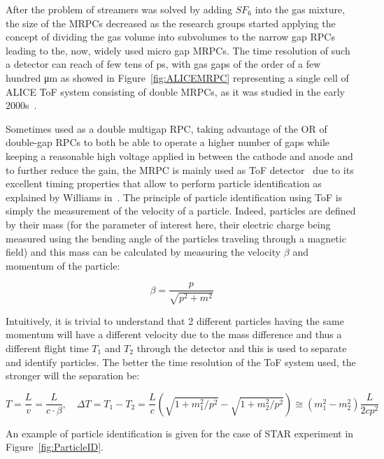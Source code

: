 	After the problem of streamers was solved by adding $SF_6$ into the gas mixture, the size of the MRPCs decreased as the research groups started applying the concept of dividing the gas volume into subvolumes to the narrow gap RPCs leading to the, now, widely used micro gap MRPCs. The time resolution of such a detector can reach of few tens of \si{ps}, with gas gaps of the order of a few hundred \si{\micro m} as showed in Figure~\ref{fig:ALICEMRPC} representing a single cell of ALICE \acf{ToF} system consisting of double MRPCs, as it was studied in the early 2000s~\cite{ALICE2002}.
	
	Sometimes used as a double multigap RPC, taking advantage of the OR of double-gap RPCs to both be able to operate a higher number of gaps while keeping a reasonable high voltage applied in between the cathode and anode and to further reduce the gain, the MRPC is mainly used as ToF detector~\cite{ALICE2002,START2002,BESIII2014,CBM2007,MPD2016} due to its excellent timing properties that allow to perform particle identification as explained by Williams in~\cite{WILLIAMS2012}. The principle of particle identification using ToF is simply the measurement of the velocity of a particle. Indeed, particles are defined by their mass (for the parameter of interest here, their electric charge being measured using the bending angle of the particles traveling through a magnetic field) and this mass can be calculated by measuring the velocity $\beta$ and momentum of the particle:
	
	\begin{equation}
		\beta = \frac{p}{\sqrt{p^2 + m^2}}
	\end{equation}
	
	Intuitively, it is trivial to understand that 2 different particles having the same momentum will have a different velocity due to the mass difference and thus a different flight time $T_1$ and $T_2$ through the detector and this is used to separate and identify particles. The better the time resolution of the ToF system used, the stronger will the separation be:
	
	\begin{equation}
		T = \frac{L}{v} = \frac{L}{c\cdot\beta}, \quad \Delta T = T_1 - T_2 = \frac{L}{c}\left(\sqrt{1+m_1^2/p^2} - \sqrt{1+m_2^2/p^2}\right) \cong (m_1^2 - m_2^2)\frac{L}{2cp^2}
	\end{equation}
	
	An example of particle identification is given for the case of STAR experiment in Figure~\ref{fig:ParticleID}.
	
